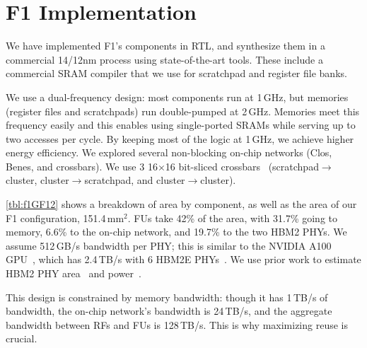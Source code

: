 \section{F1 Implementation}
\label{sec:implementation}

We have implemented F1's components in RTL,
and synthesize them in a commercial 14/12nm process using state-of-the-art tools.
These include a commercial SRAM compiler that we use for scratchpad and register file banks.

We use a dual-frequency design: most components run at 1\,GHz,
but memories (register files and scratchpads)
run double-pumped at 2\,GHz.
Memories meet this frequency easily and this enables using single-ported SRAMs while serving up to two accesses per cycle.
%
By keeping most of the logic at 1\,GHz, we achieve higher energy efficiency.
%
We explored several non-blocking on-chip networks (Clos, Benes, and crossbars).
We use 3 16$\times$16 bit-sliced crossbars~\cite{passas:tocaid12:crossbar} (scratch\-pad$\rightarrow$cluster, cluster$\rightarrow$scratchpad, and cluster$\rightarrow$cluster). %

\autoref{tbl:f1GF12} shows a breakdown of area by component, as well as the area of our F1 configuration,
151.4\,mm$^2$.
FUs take 42\% of the area, with 31.7\% going to memory,
6.6\% to the on-chip network, and 19.7\% to the two HBM2 PHYs.
We assume 512\,GB/s bandwidth per PHY;
this is similar to the NVIDIA A100 GPU~\cite{choquette2021nvidia}, which has 2.4\,TB/s with 6 HBM2E PHYs~\cite{nvidiadgx}.
We use prior work to estimate HBM2 PHY area~\cite{rambuswhite, dasgupta20208} and power~\cite{rambuswhite, ge2011design}.

This design is constrained by memory bandwidth: though it has 1\,TB/s of bandwidth,
the on-chip network's bandwidth is 24\,TB/s, and the aggregate bandwidth between RFs and FUs is 128\,TB/s.
This is why maximizing reuse is crucial.

